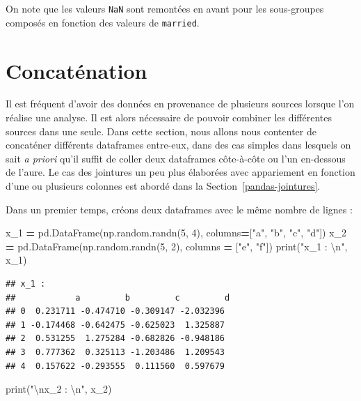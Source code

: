 \documentclass[12pt,]{book}
\newenvironment{Shaded}{\begin{snugshade}}{\end{snugshade}}
\newcommand{\DecValTok}[1]{\textcolor[rgb]{0.00,0.00,0.81}{#1}}
\newcommand{\CharTok}[1]{\textcolor[rgb]{0.31,0.60,0.02}{#1}}
\newcommand{\StringTok}[1]{\textcolor[rgb]{0.31,0.60,0.02}{#1}}
\newcommand{\OperatorTok}[1]{\textcolor[rgb]{0.81,0.36,0.00}{\textbf{#1}}}
\newcommand{\BuiltInTok}[1]{#1}
\newcommand{\NormalTok}[1]{#1}
\numberwithin{equation}{section}
\numberwithin{countremarque}{section}
\begin{document}
On note que les valeurs \texttt{NaN} sont remontées en avant pour les
sous-groupes composés en fonction des valeurs de \texttt{married}.

\section{Concaténation}\label{concatenation}

Il est fréquent d'avoir des données en provenance de plusieurs sources
lorsque l'on réalise une analyse. Il est alors nécessaire de pouvoir
combiner les différentes sources dans une seule. Dans cette section,
nous allons nous contenter de concaténer différents dataframes
entre-eux, dans des cas simples dans lesquels on sait \emph{a priori}
qu'il suffit de coller deux dataframes côte-à-côte ou l'un en-dessous de
l'aure. Le cas des jointures un peu plus élaborées avec appariement en
fonction d'une ou plusieurs colonnes est abordé dans la
Section~\ref{pandas-jointures}.

Dans un premier temps, créons deux dataframes avec le même nombre de
lignes :

\begin{Shaded}
\begin{Highlighting}[]
\NormalTok{x_1 }\OperatorTok{=}\NormalTok{ pd.DataFrame(np.random.randn(}\DecValTok{5}\NormalTok{, }\DecValTok{4}\NormalTok{),}
\NormalTok{                   columns}\OperatorTok{=}\NormalTok{[}\StringTok{"a"}\NormalTok{, }\StringTok{"b"}\NormalTok{, }\StringTok{"c"}\NormalTok{, }\StringTok{"d"}\NormalTok{])}
\NormalTok{x_2 }\OperatorTok{=}\NormalTok{ pd.DataFrame(np.random.randn(}\DecValTok{5}\NormalTok{, }\DecValTok{2}\NormalTok{),}
\NormalTok{                   columns }\OperatorTok{=}\NormalTok{ [}\StringTok{"e"}\NormalTok{, }\StringTok{"f"}\NormalTok{])}
\BuiltInTok{print}\NormalTok{(}\StringTok{"x_1 : }\CharTok{\textbackslash{}n}\StringTok{"}\NormalTok{, x_1)}
\end{Highlighting}
\end{Shaded}

\begin{lstlisting}
## x_1 : 
##            a         b         c         d
## 0  0.231711 -0.474710 -0.309147 -2.032396
## 1 -0.174468 -0.642475 -0.625023  1.325887
## 2  0.531255  1.275284 -0.682826 -0.948186
## 3  0.777362  0.325113 -1.203486  1.209543
## 4  0.157622 -0.293555  0.111560  0.597679
\end{lstlisting}

\begin{Shaded}
\begin{Highlighting}[]
\BuiltInTok{print}\NormalTok{(}\StringTok{"}\CharTok{\textbackslash{}n}\StringTok{x_2 : }\CharTok{\textbackslash{}n}\StringTok{"}\NormalTok{, x_2)}
\end{Highlighting}
\end{Shaded}
\end{document}
